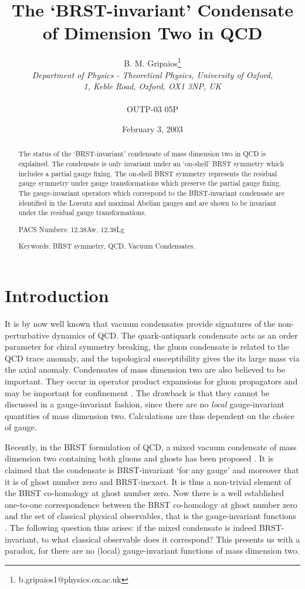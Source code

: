 \documentclass[a4paper,a4paper]{article}
\title{The `BRST-invariant' Condensate of Dimension Two in QCD}
\author{B. M. Gripaios\thanks{b.gripaios1@physics.ox.ac.uk}
\\\emph{Department of Physics - Theoretical Physics, University of Oxford,} 
\\ \emph{1, Keble Road, Oxford, OX1 3NP,  UK}
\\
\\ OUTP-03 05P}
\date{February 3, 2003}
\begin{document}

\maketitle
\begin{abstract}
The status of the `BRST-invariant' condensate of mass dimension two in QCD is explained. The condensate is only invariant under an `on-shell' BRST symmetry which includes a partial gauge fixing. The on-shell BRST symmetry represents the residual gauge symmetry under gauge transformations which preserve the partial gauge fixing. The gauge-invariant operators which correspond to the BRST-invariant condensate are identified in the Lorentz and maximal Abelian gauges and are shown to be invariant under the residual gauge transformations.

PACS Numbers: 12.38Aw, 12.38Lg

Keywords: BRST symmetry, QCD, Vacuum Condensates.
\end{abstract}

\section{Introduction}
It is by now well known that vacuum condensates provide signatures of the non-perturbative dynamics of QCD. The quark-antiquark condensate acts as an order parameter for chiral symmetry breaking, the gluon condensate is related to the QCD trace anomaly, and the topological susceptibility gives the \coordHE{} its large mass via the \coordHE{} axial anomaly. Condensates of mass dimension two are also believed to be important. They occur in operator product expansions for gluon propagators \cite{Lavelle:1988eg,Lavelle:1992yh,Gubarev:1999ie,Boucaud:2000ey,Boucaud:2000nd,Boucaud:2001st,Boucaud:2002nc,Boucaud:2002jt,Kondo:2002cy} and may be important for confinement \cite{Schaden:1999ew,Kondo:2000ey,Gubarev:2000nz,Gubarev:2000eu,Verschelde:2001ia,Dudal:2002aj,Dudal:2002xe}. The drawback is that they cannot be discussed in a gauge-invariant fashion, since there are no \emph{local} gauge-invariant quantities of mass dimension two. Calculations are thus dependent on the choice of gauge.

Recently, in the BRST \cite{Becchi:1975md,Becchi:1976nq,Tyutin:1975qk} formulation of QCD, a mixed vacuum condensate of mass dimension two containing both gluons and ghosts has been proposed \cite{Kondo:2001nq,Kondo:2001tm,Kondo:2002xn}. It is claimed that the condensate is BRST-invariant `for any gauge' and moreover that it is of ghost number zero and BRST-inexact. It is thus a non-trivial element of the BRST co-homology at ghost number zero. Now there is a well established one-to-one correspondence between the BRST co-homology at ghost number zero and the set of classical physical observables, that is the gauge-invariant functions \cite{Henneaux:1992ig}. The following question thus arises: if the mixed condensate is indeed BRST-invariant, to what classical observable does it correspond? This presents us with a paradox, for there are no (local) gauge-invariant functions of mass dimension two.
\end{document}
